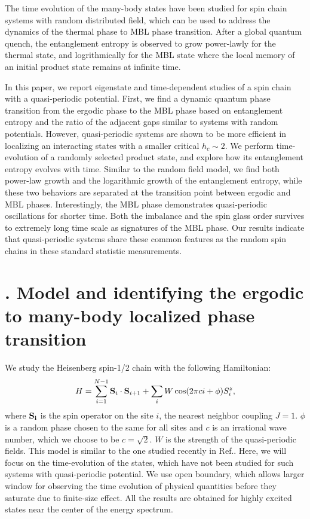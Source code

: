 \documentclass[prl,aps,epsf,showpacs,twocolumn]{revtex4}
\let\oldsection\section
\renewcommand{\section}[1]{\stepcounter{section}\oldsection{\Roman{section}. #1}}
\begin{document}
The  time evolution of the many-body states have been studied for spin chain
systems with random distributed field\cite{kjall2014,luitz2016time}, which can
be used to address the dynamics of the thermal phase to MBL phase
transition\cite{nandkishore2015,vosk_theory2014,potter2015}.  After a global
quantum quench, the entanglement entropy is observed to grow power-lawly for the
thermal state, and  logrithmically  for the MBL state where  the local memory of
an initial product state  remains at infinite time.  


In this paper, we report  eigenstate and  time-dependent studies of a spin chain
with a quasi-periodic potential.  First, we find a  dynamic quantum phase
transition from the ergodic phase to the MBL phase based on entanglement entropy
and the ratio of the adjacent gaps similar to systems with random potentials.
However, quasi-periodic systems are shown to be more efficient in localizing an
interacting states with a smaller critical $h_c \sim 2$.     We perform
time-evolution of a randomly selected  product state, and explore how its
entanglement entropy evolves with time.  Similar to the random field model, we
find both power-law  growth and the logarithmic growth of the entanglement
entropy,  while these two  behaviors are separated at the transition point
between ergodic and MBL phases.   Interestingly,  the MBL phase demonstrates
quasi-periodic oscillations for shorter time.  Both the imbalance and the spin
glass order survives to extremely long time scale as signatures  of the MBL
phase.   Our results indicate that quasi-periodic systems share these common
features as the random spin chains in these standard statistic measurements. 


\section{Model and identifying the ergodic to many-body localized phase transition}


We  study  the Heisenberg  spin-1/2 chain   
with  the following Hamiltonian:
\begin{equation}
 H =  \sum_{i=1}^{N-1} {\bf S}_i \cdot {\bf S}_{i+1}
  + \sum_{i} W\cos(2\pi c i+\phi) S_i^z,\nonumber
\end{equation}
where ${\bf S_i}$ is the spin operator on the site $i$,  the nearest neighbor
coupling  $J=1$.  $\phi$ is a random phase chosen to the same for all sites and
$c$ is an irrational wave number,  which we choose to be $c=\sqrt 2$.  $W$ is
the strength of  the quasi-periodic fields.  This model is similar to the one
studied recently in Ref.\cite{vedika2016}. Here,   we will focus on the
time-evolution of the states, which have not been studied for such systems with
quasi-periodic potential.  We use open boundary, which allows larger window for
observing the time evolution of physical quantities\cite{luitz2016time} before
they saturate due to finite-size effect.  All the results are obtained for
highly excited states near  the center of the energy spectrum.
\end{document}

